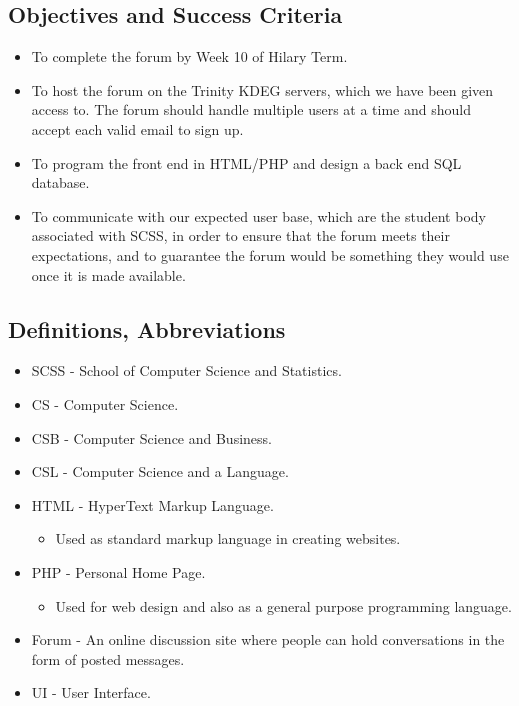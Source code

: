 \documentclass[a4paper, 12pt]{article}
\begin{document}
		\subsection{Objectives and Success Criteria}
			\begin{itemize}
				\item To complete the forum by Week 10 of Hilary Term.
				\item To host the forum on the Trinity KDEG servers, which we have been given access to. 
				The forum should handle multiple users at a time and should accept each valid email to sign up.
				\item To program the front end in HTML/PHP and design a back end SQL database.
				\item To communicate with our expected user base, which are the student body 
				associated with SCSS, in order to ensure that the forum meets their expectations, 
				and to guarantee the forum would be something they would use once it is made available.
			\end{itemize}
		\subsection{Definitions, Abbreviations}
			\begin{itemize}
				
				\item SCSS - School of Computer Science and Statistics.
				\item CS - Computer Science.
				\item CSB - Computer Science and Business.
				\item CSL - Computer Science and a Language.
				\item HTML - HyperText Markup Language.
				\begin{itemize}
					\item Used as standard markup language in creating websites.
				\end{itemize}
				\item PHP - Personal Home Page.
				\begin{itemize}
					\item Used for web design and also as a general purpose programming language.
				\end{itemize}
				\item Forum - An online discussion site where people can hold conversations in the
				form of posted messages.
				\item UI - User Interface.
			\end{itemize}
\end{document}
